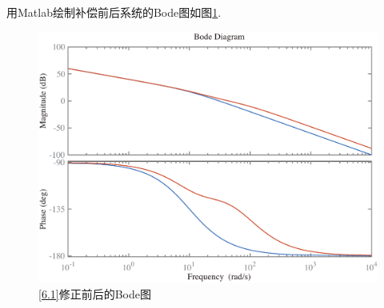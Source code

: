 用Matlab绘制补偿前后系统的Bode图如图\ref{F6.1.3}.
\begin{figure}[!htb]
	\centering
	\includegraphics[width=0.6\linewidth]{pic/6.1.2.pdf}
	\vspace*{-1em}
	\caption{\ref{6.1}修正前后的Bode图}
	\label{F6.1.3}
\end{figure}

